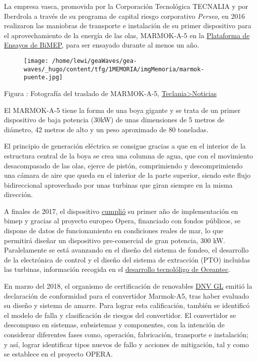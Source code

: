 \documentclass[]{article}
\begin{document}
\begin{itemize}
  La empresa vasca, promovida por la Corporación Tecnológica TECNALIA y
  por Iberdrola a través de su programa de capital riesgo corporativo
  \emph{Perseo}, en 2016 realizaron las maniobras de transporte e
  instalación de su primer dispositivo para el aprovechamiento de la
  energía de las olas, MARMOK-A-5 en la
  \href{http://bimep.com/}{Plataforma de Ensayos de BiMEP}, para ser
  ensayado durante al menos un año.

  \begin{figure}
  \centering
  \texttt{[image: /home/lewi/geaWaves/gea-waves/\_hugo/content/tfg/1MEMORIA/imgMemoria/marmok-puente.jpg]}
  \caption{}
  \end{figure}

  Figura : Fotografía del traslado de MARMOK-A-5,
  \href{https://www.tecnalia.com/es/energia-medioambiente/noticias/oceantec-instala-en-bimep-su-primer-dispositivo-para-el-aprovechamiento-de-la-energia-de-las-olas.htm}{Teclania\textgreater{}Noticias}

  El MARMOK-A-5 tiene la forma de una boya gigante y se trata de un
  primer dispositivo de baja potencia (30kW) de unas dimensiones de 5
  metros de diámetro, 42 metros de alto y un peso aproximado de 80
  toneladas.

  El principio de generación eléctrica se consigue gracias a que en el
  interior de la estructura central de la boya se crea una columna de
  agua, que con el movimiento desacompasado de las olas, ejerce de
  pistón, comprimiendo y descomprimiendo una cámara de aire que queda en
  el interior de la parte superior, siendo este flujo bidireccional
  aprovechado por unas turbinas que giran siempre en la misma dirección.

  A finales de 2017, el dispositivo
  \href{https://tidalenergytoday.com/2017/12/15/wave-device-at-bimep-marks-power-export-anniversary/}{cumplió}
  su primer año de implementación en bimep y gracias al proyecto europeo
  Opera, financiado con fondos públicos, se dispone de datos de
  funcionamiento en condiciones reales de mar, lo que permitirá diseñar
  un dispositivo pre-comercial de gran potencia, 300 kW. Paralelamente
  se está avanzando en el diseño del sistema de fondeo, el desarrollo de
  la electrónica de control y el diseño del sistema de extracción (PTO)
  incluidas las turbinas, información recogida en el
  \href{http://www.oceantecenergy.com/}{desarrollo tecnolóligo de
  Oceantec}.

  En marzo del 2018, el organismo de certificación de renovables
  \href{https://www.dnvgl.com/energy/generation/renewables-certification/index.html}{DNV
  GL} emitió la declaración de conformidad para el convertidor
  Marmok-A5, tras haber evaluado su diseño y sistema de amarre. Para
  lograr esta calificación, también se identificó el modelo de falla y
  clasificación de riesgos del convertidor. El convertidor se descompuso
  en sistemas, subsistemas y componentes, con la intención de considerar
  diferentes fases como, operación, fabricación, transporte e
  instalación; y así, lograr identificar tipos nuevos de fallo y
  acciones de mitigación, tal y como se establece en el proyecto OPERA.


\end{itemize}
\end{document}
